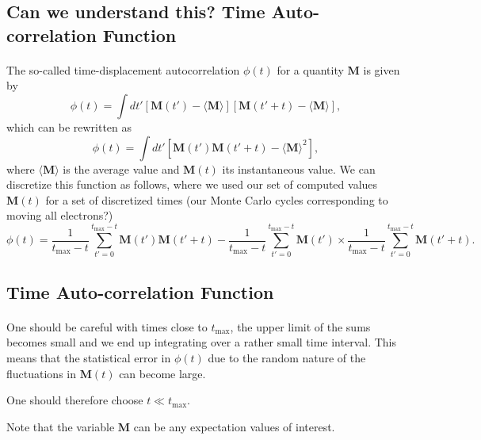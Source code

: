 \documentclass[%
oneside,                 %
final,                   %
10pt]{article}
\begin{document}
\subsection*{Can we understand this? Time Auto-correlation Function}

\paragraph{}

The so-called time-displacement autocorrelation $\phi(t)$ for a quantity $\mathbf{M}$ is given by
\[
\phi(t) = \int dt' \left[\mathbf{M}(t')-\langle \mathbf{M} \rangle\right]\left[\mathbf{M}(t'+t)-\langle \mathbf{M} \rangle\right],
\]
which can be rewritten as 
\[
\phi(t) = \int dt' \left[\mathbf{M}(t')\mathbf{M}(t'+t)-\langle \mathbf{M} \rangle^2\right],
\]
where $\langle \mathbf{M} \rangle$ is the average value and
$\mathbf{M}(t)$ its instantaneous value. We can discretize this function as follows, where we used our
set of computed values $\mathbf{M}(t)$ for a set of discretized times (our Monte Carlo cycles corresponding to moving all electrons?)
\[
\phi(t)  = \frac{1}{t_{\mathrm{max}}-t}\sum_{t'=0}^{t_{\mathrm{max}}-t}\mathbf{M}(t')\mathbf{M}(t'+t)
-\frac{1}{t_{\mathrm{max}}-t}\sum_{t'=0}^{t_{\mathrm{max}}-t}\mathbf{M}(t')\times
\frac{1}{t_{\mathrm{max}}-t}\sum_{t'=0}^{t_{\mathrm{max}}-t}\mathbf{M}(t'+t).
\label{eq:phitf}
\]



\subsection*{Time Auto-correlation Function}

\paragraph{}

One should be careful with times close to $t_{\mathrm{max}}$, the upper limit of the sums 
becomes small and we end up integrating over a rather small time interval. This means that the statistical
error in $\phi(t)$ due to the random nature of the fluctuations in $\mathbf{M}(t)$ can become large.

One should therefore choose $t \ll t_{\mathrm{max}}$.

Note that the variable $\mathbf{M}$ can be any expectation values of interest.
\end{document}
